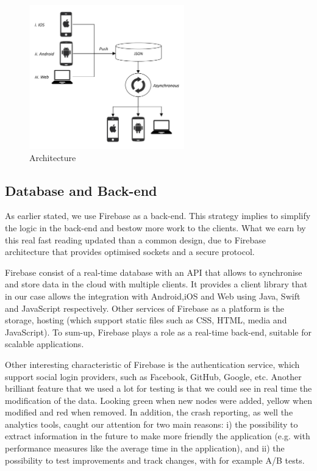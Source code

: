 \begin{figure}[ht]
\centering
\includegraphics[width=0.6\textwidth]{figs/Architecture}
	\caption{Architecture}
	\label{fig:Architecture}
\end{figure}


\subsection{Database and Back-end}

As earlier stated, we use Firebase as a back-end. This strategy implies to simplify the logic in the back-end and bestow more work to the clients. What we earn by this real fast reading updated than a common design, due to Firebase architecture that provides optimised sockets and a secure protocol.

Firebase consist of a real-time database with an API that allows to synchronise and store data in the cloud with multiple clients. It provides a client library that in our case allows the integration with Android,iOS and Web using Java, Swift and JavaScript respectively. Other services of Firebase as a platform is the storage, hosting (which support static files such as CSS, HTML, media and JavaScript).  To sum-up, Firebase plays a role as a real-time back-end, suitable for scalable applications.

Other interesting characteristic of Firebase is the authentication service, which support social login providers, such as Facebook, GitHub, Google, etc. Another brilliant feature that we used a lot for testing is that we could see in real time the modification of the data. Looking green when new nodes were added, yellow when modified and red when removed. In addition, the crash reporting, as well the analytics tools, caught our attention for two main reasons: i) the possibility to extract information in the future to make more friendly the application (e.g. with performance measures like the average time in the application), and ii) the possibility to test improvements and track changes, with for example A/B tests.

